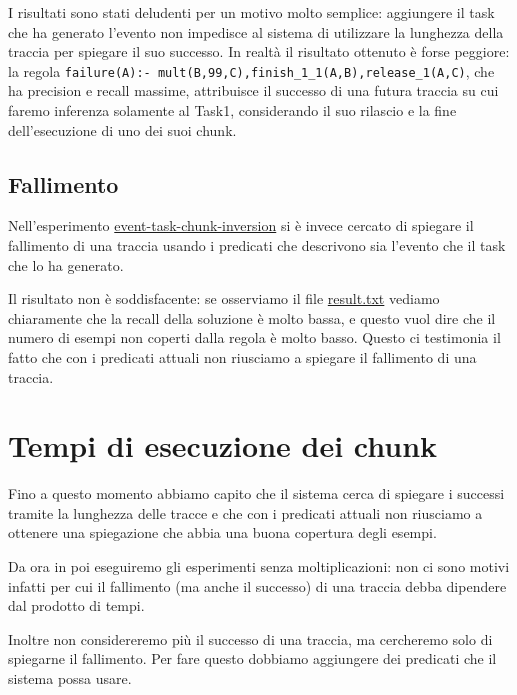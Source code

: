 I risultati sono stati deludenti per un motivo molto semplice: aggiungere il task che ha generato l'evento non impedisce al sistema di utilizzare la lunghezza della traccia per spiegare il suo successo. In realtà il risultato ottenuto è forse peggiore: la regola \texttt{failure(A):- mult(B,99,C),finish\_1\_1(A,B),release\_1(A,C)}, che ha precision e recall massime, attribuisce il successo di una futura traccia su cui faremo inferenza solamente al Task1, considerando il suo rilascio e la fine dell'esecuzione di uno dei suoi chunk.

\subsection{Fallimento}
Nell'esperimento \href{https://github.com/edoardosarri24/prediction-in-data-driven-system/tree/main/my-experiments/7-event-task-chunk-inversion}{event-task-chunk-inversion} si è invece cercato di spiegare il fallimento di una traccia usando i predicati che descrivono sia l'evento che il task che lo ha generato.

Il risultato non è soddisfacente: se osserviamo il file \href{https://github.com/edoardosarri24/prediction-in-data-driven-system/blob/main/my-experiments/7-event-task-chunk-inversion/result.txt}{result.txt} vediamo chiaramente che la recall della soluzione è molto bassa, e questo vuol dire che il numero di esempi non coperti dalla regola è molto basso. Questo ci testimonia il fatto che con i predicati attuali non riusciamo a spiegare il fallimento di una traccia.

\section{Tempi di esecuzione dei chunk}
\label{sec:execution_time}
Fino a questo momento abbiamo capito che il sistema cerca di spiegare i successi tramite la lunghezza delle tracce e che con i predicati attuali non riusciamo a ottenere una spiegazione che abbia una buona copertura degli esempi.

Da ora in poi eseguiremo gli esperimenti senza moltiplicazioni: non ci sono motivi infatti per cui il fallimento (ma anche il successo) di una traccia debba dipendere dal prodotto di tempi.

Inoltre non considereremo più il successo di una traccia, ma cercheremo solo di spiegarne il fallimento. Per fare questo dobbiamo aggiungere dei predicati che il sistema possa usare.

